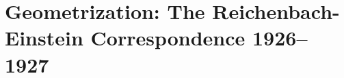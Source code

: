 \documentclass[draft]{article}
\begin{document}
\section{Geometrization: The Reichenbach-Einstein Correspondence 1926--1927}
\label{geometrization}




\end{document}
